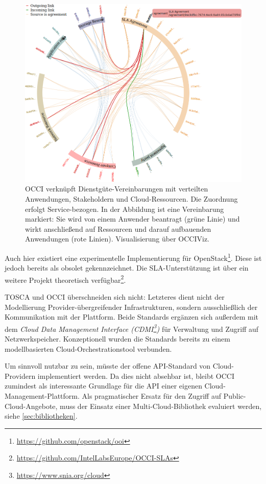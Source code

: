 \begin{description}
	\begin{figure}[h]
		\centering
		\includegraphics[width=\textwidth]{images/OCCI-relations.png}
		\caption{OCCI verknüpft Dienstgüte-Vereinbarungen mit verteilten Anwendungen, Stakeholdern und Cloud-Ressourcen. Die Zuordnung erfolgt Service-bezogen. In der Abbildung ist eine Vereinbarung markiert: Sie wird von einem Anwender beantragt (grüne Linie) und wirkt anschließend auf Ressourcen und darauf aufbauenden Anwendungen (rote Linien). Visualisierung über OCCIViz.}
		\label{fig:occi}
	\end{figure}

	Auch hier existiert eine experimentelle Implementierung für OpenStack\footnote{\url{https://github.com/openstack/ooi}}. Diese ist jedoch bereits als obsolet gekennzeichnet. Die SLA-Unterstützung ist über ein weitere Projekt theoretisch verfügbar\footnote{\url{https://github.com/IntelLabsEurope/OCCI-SLAs}}.
	
	TOSCA und OCCI überschneiden sich nicht: Letzteres dient nicht der Modellierung Provider-übergreifender Infrastrukturen, sondern ausschließlich der Kommunikation mit der Plattform. Beide Standards ergänzen sich außerdem mit dem \emph{Cloud Data Management Interface (CDMI\footnote{\url{https://www.snia.org/cloud}})} für Verwaltung und Zugriff auf Netzwerkspeicher. Konzeptionell wurden die Standards bereits zu einem modellbasierten Cloud-Orchestrationstool verbunden.
	
	Um sinnvoll nutzbar zu sein, müsste der offene API-Standard von Cloud-Providern implementiert werden. Da dies nicht absehbar ist, bleibt OCCI zumindest als interessante Grundlage für die API einer eigenen Cloud-Management-Plattform. Als pragmatischer Ersatz für den Zugriff auf Public-Cloud-Angebote, muss der Einsatz einer Multi-Cloud-Bibliothek evaluiert werden, siehe \autoref{sec:bibliotheken}.		
	
\end{description}

